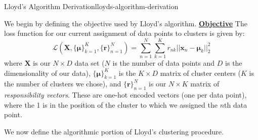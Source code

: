 \begin{derivation}{Lloyd's Algorithm Derivation}{lloyds-algorithm-derivation} \newline
	
	We begin by defining the objective used by Lloyd's algorithm. \newline \newline
	\underline{\textbf{Objective}} \newline
	The loss function for our current assignment of data points to clusters is given by:
	\begin{equation} \label{clustering-loss-fn}
		\mathcal{L}(\textbf{X}, \big\{\boldsymbol{\mu}\big\}_{k=1}^{K}, \big\{\textbf{r}\big\}_{n=1}^{N}) = \sum_{n=1}^{N} \sum_{k=1}^{K} r_{nk} ||\textbf{x}_{n} - \boldsymbol{\mu}_{k}||_2^{2}
	\end{equation}
	where $\textbf{X}$ is our $N \times D$ data set ($N$ is the number of data points and $D$ is the dimensionality of our data), $\big\{\boldsymbol{\mu}\big\}_{k=1}^{K}$ is the $K \times D$ matrix of cluster centers ($K$ is the number of clusters we chose), and $\big\{\textbf{r}\big\}_{n=1}^{N}$ is our $N \times K$ matrix of \textit{responsibility vectors}. These are one-hot encoded vectors (one per data point), where the 1 is in the position of the cluster to which we assigned the $n$th data point. \newline

	We now define the algorithmic portion of Lloyd's clustering procedure. \newline


\end{derivation}
